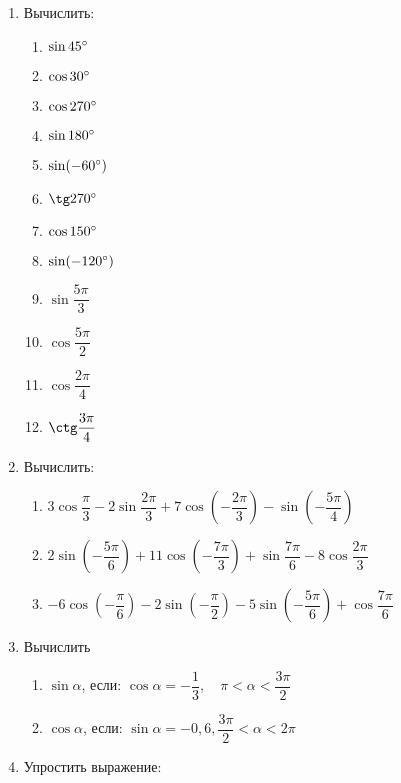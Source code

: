 \documentclass[12pt, a4paper]{article}
\begin{document}
\begin{enumerate}
		\item Вычислить:
		\begin{multicols}{4}
			\begin{enumerate}[label=\asbuk*)]
				\item $\sin 45\degree$
				\item $\cos 30\degree$
				\item $\cos 270\degree$
				\item $\sin 180\degree$
				\item $\sin (-60\degree)$
				\item $\tg 270\degree$
				\item $\cos 150\degree$
				\item $\sin (-120\degree)$
				\item $\sin \dfrac{5\pi}{3}$
				\item $\cos \dfrac{5\pi}{2}$
				\item $\cos \dfrac{2\pi}{4}$
				\item $\ctg \dfrac{3\pi}{4}$
			\end{enumerate}
		\end{multicols}
		\item Вычислить:
		\begin{enumerate}[label=\asbuk*)]
			\item $3\cos\dfrac{\pi}{3}-2\sin\dfrac{2\pi}{3}+7\cos\left(-\dfrac{2\pi}{3}\right)-\sin\left(-\dfrac{5\pi}{4}\right)$
			\item $2\sin\left(-\dfrac{5\pi}{6}\right)+11\cos\left(-\dfrac{7\pi}{3}\right)+\sin\dfrac{7\pi}{6}-8\cos\dfrac{2\pi}{3}$
			\item $-6\cos\left(-\dfrac{\pi}{6}\right)-2\sin\left(-\dfrac{\pi}{2}\right)-5\sin\left(-\dfrac{5\pi}{6}\right)+\cos\dfrac{7\pi}{6}$
		\end{enumerate}
		\item Вычислить
		\begin{multicols}{2}
			\begin{enumerate}[label=\asbuk*)]
				\item $\sin\alpha$, если: $\cos\alpha=-\dfrac{1}{3},\quad \pi<\alpha<\dfrac{3\pi}{2}$
				\item $\cos\alpha$, если: $\sin\alpha=-0,6,\dfrac{3\pi}{2}<\alpha<2\pi$
			\end{enumerate}
		\end{multicols}
		\item Упростить выражение:
		\begin{multicols}{2}
			\begin{enumerate}[label=\asbuk*)]

\end{enumerate}
\end{multicols}
\end{enumerate}
\end{document}
